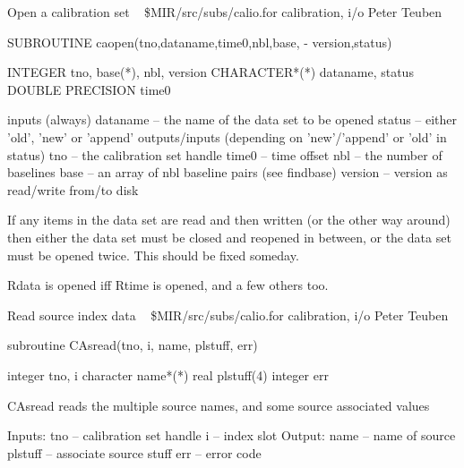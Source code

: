 %
\noindent Open a calibration set
\newline \ 
\newline {} \$MIR/src/subs/calio.for
\newline {} calibration, i/o
\newline {} Peter Teuben
\par{\tenpoint
{\eightpoint\begintt
        SUBROUTINE caopen(tno,dataname,time0,nbl,base,
     -                    version,status)

        INTEGER          tno, base(*), nbl, version
        CHARACTER*(*)    dataname, status
        DOUBLE PRECISION time0

    inputs (always)
       dataname -- the name of the data set to be opened
       status   -- either 'old', 'new' or 'append'
    outputs/inputs (depending on 'new'/'append' or 'old' in status)
       tno      -- the calibration set handle
       time0    -- time offset
       nbl      -- the number of baselines
       base     -- an array of nbl baseline pairs (see findbase)
       version  -- version as read/write from/to disk

    If any items in the data set are read and then written (or the other
    way around) then either the data set must be closed and reopened in
    between, or the data set must be opened twice.  This should be fixed
    someday.

  Rdata is opened iff Rtime is opened, and a few others too.
\endtt}
\par}
%
\noindent Read source index data
\newline \ 
\newline {} \$MIR/src/subs/calio.for
\newline {} calibration, i/o
\newline \abox{Responsible:} Peter Teuben
\par{\tenpoint
{\eightpoint\begintt
        subroutine CAsread(tno, i, name, plstuff, err)

        integer   tno, i
        character name*(*)
        real      plstuff(4)
        integer   err

       CAsread reads the multiple source names, and some source
       associated values

   Inputs:
       tno     -- calibration set handle
       i       -- index slot
   Output:
       name    -- name of source
       plstuff -- associate source stuff
       err     -- error code
\endtt}
\par}
